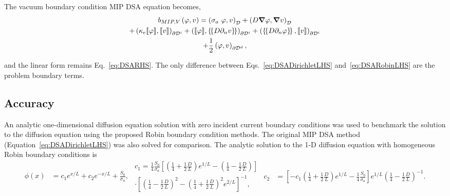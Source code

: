 \documentclass[12pt]{article}
\begin{document}
\noindent The vacuum boundary condition MIP DSA equation becomes,
\begin{multline}
b_{MIP,V} \left(\varphi, v \right) = \left(\sigma_a\ \varphi, v \right)_\mathcal{D} + \left(D \bm{\nabla} \varphi, \bm{\nabla} v \right)_\mathcal{D} \\
+ \left( \kappa_e \llbracket \varphi \rrbracket, \llbracket v \rrbracket \right)_{\partial \mathcal{D}^i}
+ \left( \llbracket \varphi \rrbracket , \left\{\!\left\{ D \partial_n v \right\} \! \right\} \right)_{\partial \mathcal{D}^i} + \left( \left\{ \! \left\{ D \partial_n \varphi \right\} \! \right\} , \llbracket v \rrbracket \right)_{\partial \mathcal{D}^i} \\
+ \frac{1}{2} \left(\varphi, v \right)_{\partial \mathcal{D}^d},
\label{eq:DSARobinLHS}
\end{multline}

\noindent and the linear form remains Eq.~\ref{eq:DSARHS}. The only difference between Eqs.~\ref{eq:DSADirichletLHS} and~\ref{eq:DSARobinLHS} are the problem boundary terms.


\subsection{Accuracy}
\label{sec:MIPDSARobinBCAccuracy}
An analytic one-dimensional diffusion equation solution with zero incident current boundary conditions was used to benchmark the solution to the diffusion equation using the proposed Robin boundary condition methods. The original MIP DSA method (Equation~\ref{eq:DSADirichletLHS}) was also solved for comparison. The analytic solution to the 1-D diffusion equation with homogeneous Robin boundary conditions is
\begin{subequations}
\begin{flalign}
\phi \left(x \right) & = c_1 e^{x/L} + c_2 e^{-x/L} + \frac{S_0}{\sigma_a},
\end{flalign}
\begin{multline}
c_1 = \frac{1}{4} \frac{S_0}{\sigma_a} \left[ \left(\frac{1}{4} + \frac{1}{2} \frac{D}{L} \right) e^{1/L} - \left(\frac{1}{4} - \frac{1}{2} \frac{D}{L} \right) \right] \\
\cdot \left[\left(\frac{1}{4} - \frac{1}{2} \frac{D}{L} \right)^2 - \left(\frac{1}{4} + \frac{1}{2} \frac{D}{L} \right)^2 e^{2/L} \right]^{-1},
\end{multline}
\begin{flalign}
c_2 & = \left[-c_1 \left(\frac{1}{4} + \frac{1}{2} \frac{D}{L} \right) e^{1/L} - \frac{1}{4} \frac{S_0}{\sigma_a} \right] e^{1/L} \left(\frac{1}{4} - \frac{1}{2} \frac{D}{L} \right)^{-1}.
\end{flalign}
\end{subequations}
\end{document}
